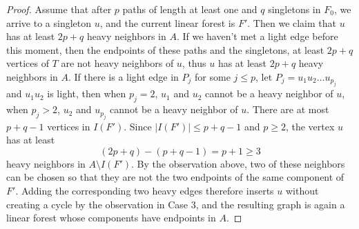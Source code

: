 \documentclass[12pt]{article}
\begin{document}
\begin{proof}
    Assume that after $p$ paths of length at least one and $q$ singletons in $F_0$, we arrive to a singleton $u$, and the current linear forest is $F'$. 
    Then we claim that $u$ has at least $2p+q$ heavy neighbors in $A$.
    If we haven't met a light edge before this moment, then the endpoints of these paths and the singletons, at least $2p+q$ vertices of $T$ are not heavy neighbors of $u$, thus $u$ has at least $2p+q$ heavy neighbors in $A$. 
    If there is a light edge in $P_{j}$ for some $j \le p$, let $P_j = u_1u_2\ldots u_{p_j}$ and $u_1u_2$ is light, then when $p_j = 2$, $u_1$ and $u_2$ cannot be a heavy neighbor of $u$, when $p_j > 2$, $u_2$ and $u_{p_j}$ cannot be a heavy neighbor of $u$.
    There are at most $p+q-1$ vertices in $I(F')$.
    Since $|I(F')|\le p+q-1$ and $p\ge 2$, the vertex $u$ has at least
$$
(2p+q)-(p+q-1)=p+1\ge 3
$$
heavy neighbors in $A\setminus I(F')$. By the observation above, two of
these neighbors can be chosen so that they are not the two endpoints of the
same component of $F'$. Adding the corresponding two heavy edges therefore
inserts $u$ without creating a cycle by the observation in Case 3, and the resulting graph is again a
linear forest whose components have endpoints in $A$.  
\end{proof}
\end{document}
